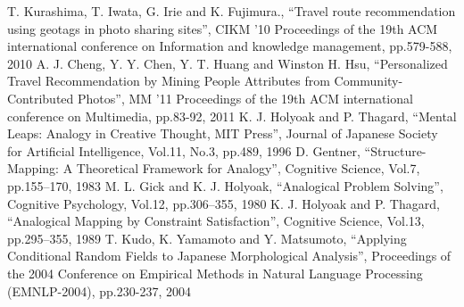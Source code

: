 \documentclass[submit,techrep,noauthor]{ipsj}
\begin{document}
\begin{thebibliography}{11}
    T. Kurashima, T. Iwata, G. Irie and K. Fujimura.,
      ``Travel route recommendation using geotags in photo sharing sites'',
      CIKM '10 Proceedings of the 19th ACM international conference on Information and knowledge management, pp.579-588, 2010
    A. J. Cheng, Y. Y. Chen, Y. T. Huang and Winston H. Hsu,
      ``Personalized Travel Recommendation by Mining People Attributes from Community-Contributed Photos'',
      MM '11 Proceedings of the 19th ACM international conference on Multimedia, pp.83-92, 2011
    K. J. Holyoak and P. Thagard,
      ``Mental Leaps: Analogy in Creative Thought, MIT Press'',
      Journal of Japanese Society for Artificial Intelligence,  Vol.11, No.3,  pp.489, 1996
    D. Gentner,
      ``Structure-Mapping: A Theoretical Framework for Analogy'',
      Cognitive Science, Vol.7, pp.155–170, 1983
    M. L. Gick and K. J. Holyoak,
      ``Analogical Problem Solving'',
      Cognitive Psychology, Vol.12, pp.306–355, 1980
    K. J. Holyoak and P. Thagard,
      ``Analogical Mapping by Constraint Satisfaction'',
      Cognitive Science, Vol.13, pp.295–355, 1989
    T. Kudo, K. Yamamoto and Y. Matsumoto,
      ``Applying Conditional Random Fields to Japanese Morphological Analysis'',
      Proceedings of the 2004 Conference on Empirical Methods in Natural Language Processing (EMNLP-2004), pp.230-237, 2004
\end{thebibliography}
\end{document}
